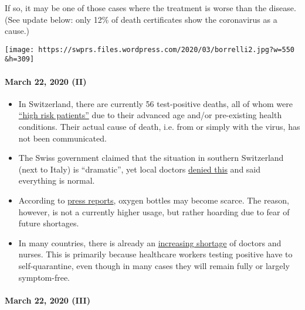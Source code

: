 If so, it may be one of those cases where the treatment is worse than
the disease. (See update below: only 12\% of death certificates show the
coronavirus as a cause.)

\texttt{[image: https://swprs.files.wordpress.com/2020/03/borrelli2.jpg?w=550\\\&h=309]}

\hypertarget{march-22-2020-ii}{%
\paragraph{March 22, 2020 (II)}\label{march-22-2020-ii}}

\begin{itemize}
\tightlist
\item
  In Switzerland, there are currently 56 test-positive deaths, all of
  whom were
  \href{https://www.nzz.ch/schweiz/coronavirus-in-der-schweiz-die-neusten-entwicklungen-ld.1542664\#subtitle-wie-viele-infizierte-und-todesf-lle-gibt-es-second}{``high
  risk patients''} due to their advanced age and/or pre-existing health
  conditions. Their actual cause of death, i.e. from or simply with the
  virus, has not been communicated.
\item
  The Swiss government claimed that the situation in southern
  Switzerland (next to Italy) is ``dramatic'', yet local doctors
  \href{https://www.nzz.ch/schweiz/punkto-intensivbetten-sind-wir-im-tessin-besser-ausgeruestet-als-der-rest-der-schweiz-ld.1547728}{denied
  this} and said everything is normal.
\item
  According to
  \href{https://www.blick.ch/news/schweiz/nicht-nur-beatmungsgeraete-werden-knapp-im-kampf-gegen-corona-es-droht-ein-engpass-beim-sauerstoff-id15808185.html}{press
  reports}, oxygen bottles may become scarce. The reason, however, is
  not a currently higher usage, but rather hoarding due to fear of
  future shortages.
\item
  In many countries, there is already an
  \href{https://www.washingtonpost.com/health/covid-19-hits-doctors-nurses-emts-threatening-health-system/2020/03/17/f21147e8-67aa-11ea-b313-df458622c2cc_story.html}{increasing
  shortage} of doctors and nurses. This is primarily because healthcare
  workers testing positive have to self-quarantine, even though in many
  cases they will remain fully or largely symptom-free.
\end{itemize}

\hypertarget{march-22-2020-iii}{%
\paragraph{March 22, 2020 (III)}\label{march-22-2020-iii}}

